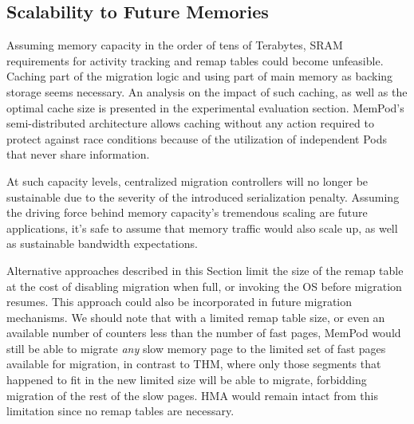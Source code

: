 \subsection{Scalability to Future Memories}
Assuming memory capacity in the order of tens of Terabytes, SRAM requirements for activity tracking and remap tables could become unfeasible. Caching part of the migration logic and using part of main memory as backing storage seems necessary. An analysis on the impact of such caching, as well as the optimal cache size is presented in the experimental evaluation section. MemPod's semi-distributed architecture allows caching without any action required to protect against race conditions because of the utilization of independent Pods that never share information.

At such capacity levels, centralized migration controllers will no longer be sustainable due to the severity of the introduced serialization penalty. Assuming the driving force behind memory capacity's tremendous scaling are future applications, it's safe to assume that memory traffic would also scale up, as well as sustainable bandwidth expectations. 

Alternative approaches described in this Section limit the size of the remap table at the cost of disabling migration when full, or invoking the OS before migration resumes. This approach could also be incorporated in future migration mechanisms. We should note that with a limited remap table size, or even an available number of counters less than the number of fast pages, MemPod would still be able to migrate \textit{any} slow memory page to the limited set of fast pages available for migration, in contrast to THM, where only those segments that happened to fit in the new limited size will be able to migrate, forbidding migration of the rest of the slow pages. HMA would remain intact from this limitation since no remap tables are necessary.



















































